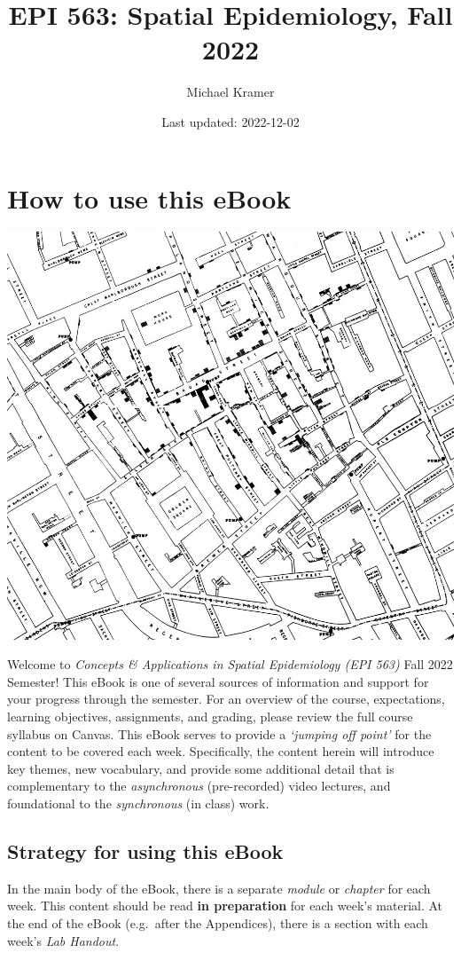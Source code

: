 \documentclass[
]{book}
\title{EPI 563: Spatial Epidemiology, Fall 2022}
\author{Michael Kramer}
\date{Last updated: 2022-12-02}
\begin{document}
\maketitle

{
\setcounter{tocdepth}{2}
\tableofcontents
}
\hypertarget{how-to-use-this-ebook}{%
\chapter*{How to use this eBook}\label{how-to-use-this-ebook}}

\begin{center}\includegraphics[width=0.5\linewidth]{images/John-Snows-cholera-map-of-009} \end{center}

Welcome to \emph{Concepts \& Applications in Spatial Epidemiology (EPI 563)} Fall 2022 Semester! This eBook is one of several sources of information and support for your progress through the semester. For an overview of the course, expectations, learning objectives, assignments, and grading, please review the full course syllabus on Canvas. This eBook serves to provide a \emph{`jumping off point'} for the content to be covered each week. Specifically, the content herein will introduce key themes, new vocabulary, and provide some additional detail that is complementary to the \emph{asynchronous} (pre-recorded) video lectures, and foundational to the \emph{synchronous} (in class) work.

\hypertarget{strategy-for-using-this-ebook}{%
\section*{Strategy for using this eBook}\label{strategy-for-using-this-ebook}}

In the main body of the eBook, there is a separate \emph{module} or \emph{chapter} for each week. This content should be read \textbf{in preparation} for each week's material. At the end of the eBook (e.g.~after the Appendices), there is a section with each week's \emph{Lab Handout}.
\end{document}
